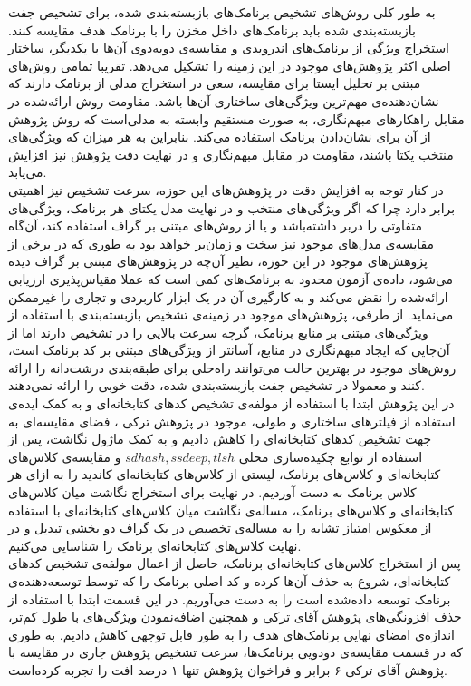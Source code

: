 
\label{conclusion}
به طور کلی روش‌های تشخیص برنامک‌های بازبسته‌بندی شده، برای تشخیص جفت بازبسته‌بندی شده باید برنامک‌های داخل مخزن را با برنامک‌ هدف مقایسه کنند. استخراج ويژگی‌ از برنامک‌های اندرویدی و مقایسه‌ی دوبه‌دوی آن‌ها با یکدیگر، ساختار اصلی اکثر پژوهش‌های موجود در این زمینه را تشکیل می‌دهد. تقریبا تمامی روش‌های مبتنی بر تحلیل ایستا برای مقایسه‌، سعی در استخراج مدلی از برنامک دارند که نشان‌دهنده‌ی مهم‌ترین ویژگی‌های ساختاری آن‌ها باشد. مقاومت روش ارائه‌شده در مقابل راهکار‌های مبهم‌نگاری، به صورت مستقیم وابسته به مدلی‌است که روش پژوهش از آن برای نشان‌دادن برنامک استفاده می‌کند. بنابراین به هر میزان که ویژگی‌های منتخب یکتا باشند، مقاومت در مقابل مبهم‌نگاری و در نهایت دقت پژوهش نیز افزایش می‌یابد.\\
در کنار توجه به افزایش دقت در پژوهش‌های این حوزه، سرعت تشخیص نیز اهمیتی برابر دارد چرا که اگر ویژگی‌های منتخب و در نهایت مدل یکتای‌ هر برنامک، ویژگی‌های متفاوتی را دربر داشته‌باشد و یا از روش‌های مبتنی بر گراف استفاده کند، آن‌گاه مقایسه‌ی مدل‌های موجود نیز سخت و زمان‌بر خواهد بود به طوری که در برخی از پژوهش‌های موجود در این حوزه، نظیر آن‌چه در پژوهش‌های مبتنی بر گراف دیده می‌شود، داده‌ی آزمون محدود به برنامک‌های کمی است که عملا مقیاس‌پذیری ارزیابی ارائه‌شده را نقض می‌کند و به کارگیری آن در یک ابزار کاربردی و تجاری را غیرممکن می‌نماید. از طرفی، پژوهش‌های موجود در زمینه‌ی تشخیص بازبسته‌بندی با استفاده از ویژگی‌های مبتنی بر منابع برنامک، گرچه سرعت بالایی را در تشخیص دارند اما از آن‌جایی که ایجاد مبهم‌نگاری در منابع، آسانتر از ویژگی‌های مبتنی بر کد برنامک است، روش‌های موجود در بهترین حالت می‌توانند راه‌حلی برای طبقه‌بندی درشت‌دانه را ارائه کنند و معمولا در تشخیص جفت ‌بازبسته‌بندی شده، دقت خوبی را ارائه نمی‌دهند.\\
در این پژوهش ابتدا با استفاده از مولفه‌ی تشخیص کد‌های کتابخانه‌ای و به کمک ایده‌ی استفاده از فیلتر‌های ساختاری و طولی، موجود در پژوهش ترکی ، فضای مقایسه‌‌ای به جهت تشخیص کد‌های کتابخانه‌ای را کاهش دادیم و به کمک ماژول نگاشت، پس از استفاده از توابع چکیده‌سازی محلی $sdhash,ssdeep,tlsh$ و مقایسه‌ی کلاس‌های کتابخانه‌ای و کلاس‌های برنامک، لیستی از کلاس‌های کتابخانه‌ای کاندید را به ازای هر کلاس برنامک به دست آوردیم. در نهایت برای استخراج نگاشت میان کلاس‌های کتابخانه‌ای و کلاس‌های برنامک، مساله‌ی نگاشت میان کلاس‌های کتابخانه‌ای با استفاده از معکوس امتیاز تشابه را به مساله‌ی تخصیص در یک گراف دو بخشی تبدیل و در نهایت کلاس‌های کتابخانه‌ای برنامک را شناسایی می‌کنیم. \\
پس از استخراج کلاس‌های کتابخانه‌ای برنامک، حاصل از اعمال مولفه‌ی تشخیص کد‌های کتابخانه‌ای، شروع به حذف آن‌ها کرده و کد اصلی برنامک را که توسط توسعه‌دهنده‌ی برنامک توسعه‌ داده‌شده است را به دست می‌آوریم. در این قسمت ابتدا با استفاده از حذف افزونگی‌های پژوهش آقای ترکی و همچنین اضافه‌نمودن ویژگی‌های با طول کم‌تر، اندازه‌ی امضای نهایی برنامک‌های هدف را به طور قابل توجهی کاهش دادیم. به طوری که در قسمت مقایسه‌ی دودویی برنامک‌ها، سرعت تشخیص پژوهش جاری در مقایسه با پژوهش آقای ترکی ۶ برابر و فراخوان پژوهش تنها ۱ درصد افت را تجربه‌ کرده‌است. 
